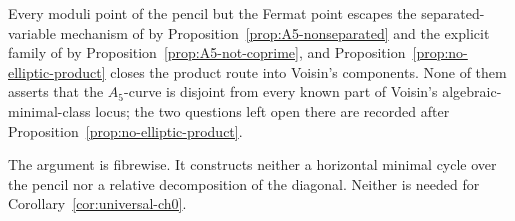 Every moduli point of the pencil but the Fermat point escapes the
separated-variable mechanism of \cite{CT} by
Proposition~\ref{prop:A5-nonseparated} and the explicit family of \cite{YYZ}
by Proposition~\ref{prop:A5-not-coprime}, and
Proposition~\ref{prop:no-elliptic-product} closes the product route into
Voisin's components.  None of them asserts that the \(A_5\)-curve is disjoint
from every known part of Voisin's algebraic-minimal-class locus; the two
questions left open there are recorded after
Proposition~\ref{prop:no-elliptic-product}.

The argument is fibrewise.  It constructs neither a horizontal minimal cycle
over the pencil nor a relative decomposition of the diagonal.  Neither is
needed for Corollary~\ref{cor:universal-ch0}.
